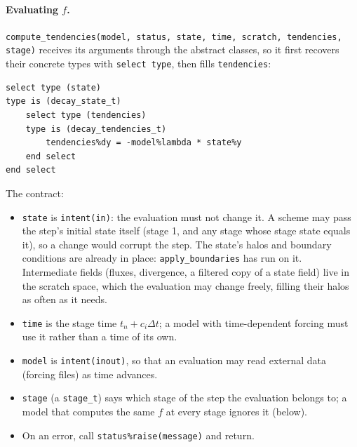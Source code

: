 \documentclass[11pt,a4paper]{article}
\newcommand{\dt}{\Delta t}
\newcommand{\code}[1]{\texttt{#1}}
\begin{document}
\paragraph{Evaluating $f$.}
\code{compute\_tendencies(model, status, state, time, scratch, tendencies, stage)}
receives its arguments through the abstract classes, so it first recovers
their concrete types with \code{select type}, then fills \code{tendencies}:
\begin{lstlisting}
select type (state)
type is (decay_state_t)
    select type (tendencies)
    type is (decay_tendencies_t)
        tendencies%dy = -model%lambda * state%y
    end select
end select
\end{lstlisting}
The contract:
\begin{itemize}
  \item \code{state} is \code{intent(in)}: the evaluation must not change it.
    A scheme may pass the step's initial state itself (stage 1, and any stage
    whose stage state equals it), so a change would corrupt the step. The
    state's halos and boundary conditions are already in place: \code{apply\_boundaries}
    has run on it. Intermediate fields (fluxes, divergence, a filtered copy of a
    state field) live in the scratch space, which the evaluation may change
    freely, filling their halos as often as it needs.
  \item \code{time} is the stage time $t_n + c_i\dt$; a model with
    time-dependent forcing must use it rather than a time of its own.
  \item \code{model} is \code{intent(inout)}, so that an evaluation may read
    external data (forcing files) as time advances.
  \item \code{stage} (a \code{stage\_t}) says which stage of the step the
    evaluation belongs to; a model that computes the same $f$ at every stage
    ignores it (below).
  \item On an error, call \code{status\%raise(message)} and return.
\end{itemize}
\end{document}
